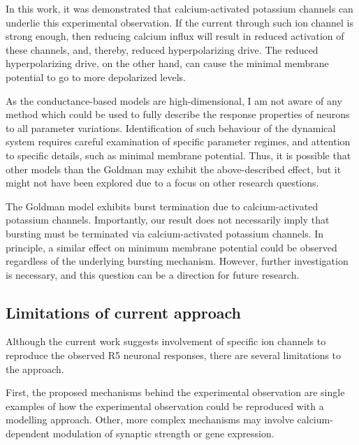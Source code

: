 \documentclass[../main.tex]{subfiles}
\begin{document}
In this work, it was demonstrated that calcium-activated potassium channels can underlie this experimental observation. If the current through such ion channel is strong enough, then reducing calcium influx will result in reduced activation of these channels, and, thereby, reduced hyperpolarizing drive. The reduced hyperpolarizing drive, on the other hand, can cause the minimal membrane potential to go to more depolarized levels.

As the conductance-based models are high-dimensional, I am not aware of any method which could be used to fully describe the response properties of neurons to all parameter variations. Identification of such behaviour of the dynamical system requires careful examination of specific parameter regimes, and attention to specific details, such as minimal membrane potential. Thus, it is possible that other models than the Goldman may exhibit the above-described effect, but it might not have been explored due to a focus on other research questions.

The Goldman model exhibits burst termination due to calcium-activated potassium channels.
Importantly, our result does not necessarily imply that bursting must be terminated via calcium-activated potassium channels. In principle, a similar effect on minimum membrane potential could be observed regardless of the underlying bursting mechanism. However, further investigation is necessary, and this question can be a direction for future research.



\subsection{Limitations of current approach}

Although the current work suggests involvement of specific ion channels to reproduce the observed R5 neuronal responses, there are several limitations to the approach.

First, the proposed mechanisms behind the experimental observation are single examples of how the experimental observation could be reproduced with a modelling approach. Other, more complex mechanisms may involve calcium-dependent modulation of synaptic strength or gene expression. 
\end{document}
